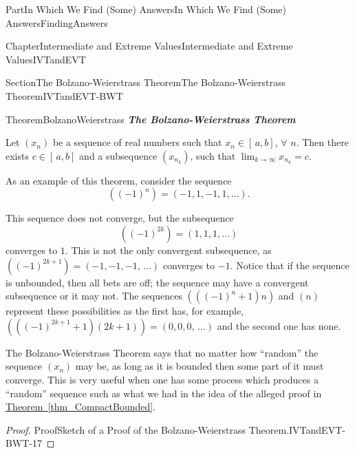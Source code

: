 \documentclass[oneside,10pt,]{book}
\newcommand{\xreffont}{\relax}
\newcommand{\alert}[1]{\textbf{\textit{#1}}}
\numberwithin{equation}{part}
\begin{document}
\begin{partptx}{Part}{In Which We Find (Some) Answers}{}{In Which We Find (Some) Answers}{}{}{FindingAnswers}
\begin{chapterptx}{Chapter}{Intermediate and Extreme Values}{}{Intermediate and Extreme Values}{}{}{IVTandEVT}
\begin{sectionptx}{Section}{The Bolzano-Weierstrass Theorem}{}{The Bolzano-Weierstrass Theorem}{}{}{IVTandEVT-BWT}
\begin{theorem}{Theorem}{}{}{BolzanoWeierstrass}
\alert{The Bolzano-Weierstrass Theorem}%
\par
{} Let \(\left(x_n\right)\) be a sequence of real numbers such that \(x_n\in[\,a,b]\), \(\forall\) \(n\).  Then there exists \(c\in[\,a,b]\) and a subsequence \(\left(x_{n_k}\right)\), such that \(\lim_{k\rightarrow\infty}x_{n_k}=c\).%
\end{theorem}
As an example of this theorem, consider the sequence%
\begin{equation*}
\left((-1)^n\right)=\left(-1,1,-1,1,\ldots\right) \text{.}
\end{equation*}
%
\par
This sequence does not converge, but the subsequence%
\begin{equation*}
\left((-1)^{2k}\right)=\left(1,1,1,\ldots\right)
\end{equation*}
converges to \(1\). This is not the only convergent subsequence, as \(\left((-1)^{2k+1}\right)=(-1,-1,-1,\,\ldots)\) converges to \(-1\). Notice that if the sequence is unbounded, then all bets are off; the sequence may have a convergent subsequence or it may not. The sequences \(\left(\left((-1)^n+1\right)n\right)\) and \(\left(n\right)\) represent these possibilities as the first has, for example, \(\left(\left((-1)^{2k+1}+1\right)(2k+1)\right)=(0,0,0,\,\ldots)\) and the second one has none.%
\par
The Bolzano-Weierstrass Theorem says that no matter how ``random'' the sequence \(\left(x_n\right)\) may be, as long as it is bounded then some part of it must converge. This is very useful when one has some process which produces a ``random'' sequence such as what we had in the idea of the alleged proof in \hyperref[thm_CompactBounded]{Theorem~{\xreffont\ref{thm_CompactBounded}}}.%
\begin{proof}{Proof}{Sketch of a Proof of the Bolzano-Weierstrass Theorem.}{IVTandEVT-BWT-17}

\end{proof}
\end{sectionptx}
\end{chapterptx}
\end{partptx}
\end{document}
